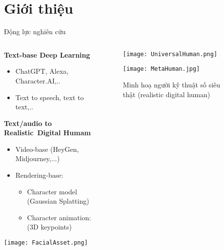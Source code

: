 \section{Giới thiệu}

\begin{frame}{Động lực nghiên cứu}
	\vspace{5pt}
	
	\begin{columns}
	\begin{column}{0.7\textwidth}
		\textbf{Text-base Deep Learning}
		\begin{itemize}
			\item ChatGPT, Alexa, Character.AI,..
			\item Text to speech, text to text,..
		\end{itemize}
		
		\textbf{Text/audio to Realistic Digital Humam}
		
		\begin{itemize}
			\item Video-base (HeyGen, Midjourney,...)
			\item Rendering-base:
			\begin{itemize}
				\item Character model (Gaussian Splatting)
				\item Character animation: (3D keypoints)
			\end{itemize}
		\end{itemize}
		\vspace{5pt}
		\centering
		\texttt{[image: FacialAsset.png]}
	\end{column}
	
	\begin{column}{0.3\textwidth}
		\begin{figure}
				\texttt{[image: UniversalHuman.png]}
		\end{figure}
		
		\begin{figure}
			\texttt{[image: MetaHuman.jpg]}
			\caption{\small Minh hoạ người kỹ thuật số siêu thật (realistic digital human)}
		\end{figure}
	
	\end{column}
	
	\end{columns}
\end{frame}



